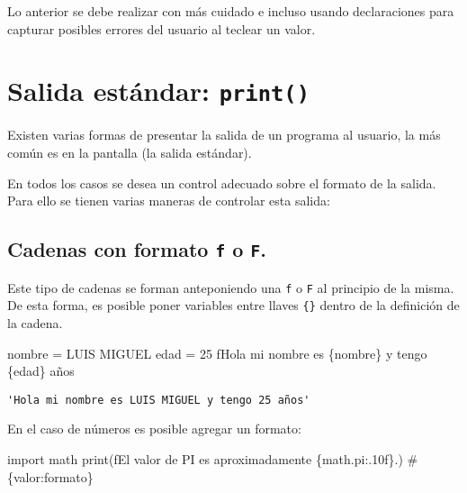 \documentclass[
  letterpaper,
  DIV=11,
  numbers=noendperiod]{scrreprt}
\newenvironment{Shaded}{\begin{snugshade}}{\end{snugshade}}
\newcommand{\BuiltInTok}[1]{\textcolor[rgb]{0.00,0.23,0.31}{#1}}
\newcommand{\CommentTok}[1]{\textcolor[rgb]{0.37,0.37,0.37}{#1}}
\newcommand{\DecValTok}[1]{\textcolor[rgb]{0.68,0.00,0.00}{#1}}
\newcommand{\ImportTok}[1]{\textcolor[rgb]{0.00,0.46,0.62}{#1}}
\newcommand{\NormalTok}[1]{\textcolor[rgb]{0.00,0.23,0.31}{#1}}
\newcommand{\OperatorTok}[1]{\textcolor[rgb]{0.37,0.37,0.37}{#1}}
\newcommand{\SpecialCharTok}[1]{\textcolor[rgb]{0.37,0.37,0.37}{#1}}
\newcommand{\SpecialStringTok}[1]{\textcolor[rgb]{0.13,0.47,0.30}{#1}}
\newcommand{\StringTok}[1]{\textcolor[rgb]{0.13,0.47,0.30}{#1}}
\begin{document}
Lo anterior se debe realizar con más cuidado e incluso usando
declaraciones para capturar posibles errores del usuario al teclear un
valor.


\chapter{\texorpdfstring{Salida estándar:
\texttt{print()}}{Salida estándar: print()}}\label{salida-estuxe1ndar-print}

Existen varias formas de presentar la salida de un programa al usuario,
la más común es en la pantalla (la salida estándar).

En todos los casos se desea un control adecuado sobre el formato de la
salida. Para ello se tienen varias maneras de controlar esta salida:

\section{\texorpdfstring{Cadenas con formato \texttt{f} o
\texttt{F}.}{Cadenas con formato f o F.}}\label{cadenas-con-formato-f-o-f.}

Este tipo de cadenas se forman anteponiendo una \texttt{f} o \texttt{F}
al principio de la misma. De esta forma, es posible poner variables
entre llaves \texttt{\{\}} dentro de la definición de la cadena.

\begin{Shaded}
\begin{Highlighting}[]
\NormalTok{nombre }\OperatorTok{=} \StringTok{\textquotesingle{}LUIS MIGUEL\textquotesingle{}}
\NormalTok{edad }\OperatorTok{=} \DecValTok{25}
\SpecialStringTok{f\textquotesingle{}Hola mi nombre es }\SpecialCharTok{\{}\NormalTok{nombre}\SpecialCharTok{\}}\SpecialStringTok{ y tengo }\SpecialCharTok{\{}\NormalTok{edad}\SpecialCharTok{\}}\SpecialStringTok{ años\textquotesingle{}}
\end{Highlighting}
\end{Shaded}

\begin{verbatim}
'Hola mi nombre es LUIS MIGUEL y tengo 25 años'
\end{verbatim}

En el caso de números es posible agregar un formato:

\begin{Shaded}
\begin{Highlighting}[]
\ImportTok{import}\NormalTok{ math}
\BuiltInTok{print}\NormalTok{(}\SpecialStringTok{f\textquotesingle{}El valor de PI es aproximadamente }\SpecialCharTok{\{}\NormalTok{math}\SpecialCharTok{.}\NormalTok{pi}\SpecialCharTok{:.10f\}}\SpecialStringTok{.\textquotesingle{}}\NormalTok{) }\CommentTok{\# \{valor:formato\}}
\end{Highlighting}
\end{Shaded}
\end{document}
